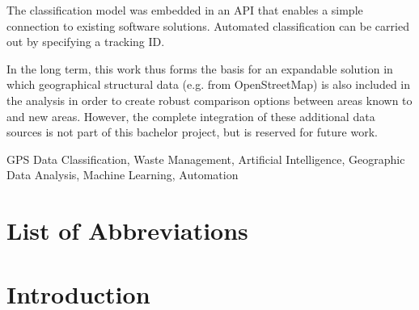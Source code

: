 \documentclass[a4paper,12pt,twoside]{scrreprt}
\begin{document}
The classification model was embedded in an API that enables a simple
connection to existing software solutions. Automated classification can be
carried out by specifying a
tracking ID.

In the long term, this work thus forms the basis for an expandable
solution in which geographical structural data (e.g. from OpenStreetMap) is
also included in
the analysis in order to create robust comparison options between areas known
to
and new areas. However, the complete integration of these
additional data sources is not part of this bachelor project,
but is reserved for future work.
\vspace{0.5cm}

\noindent
GPS Data Classification, Waste Management, Artificial Intelligence, Geographic
Data Analysis, Machine Learning, Automation

\cleardoublepage   %
\begingroup
\setlength{\cftbeforechapskip}{6pt}
\tableofcontents
\endgroup

\clearpage
{}
{}
\listoffigures

\clearpage
{}
{}
\listoftables

\clearpage
{}
{}
\chapter*{List of Abbreviations}
\begin{acronym}[WGS84]
\end{acronym}

\chapter{Introduction}
\end{document}
